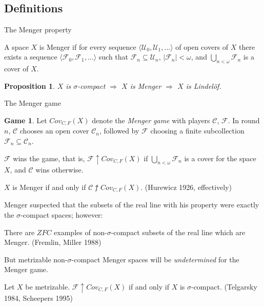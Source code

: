 \documentclass{beamer}
\newtheorem{proposition}[theorem]{Proposition}
\theoremstyle{definition}
\newtheorem{game}[theorem]{Game}
\newcommand{\win}{\uparrow}
\newcommand{\mengame}[1]{Cov_{C,F}(#1)}
\newcommand{\<}{\langle}
\renewcommand{\>}{\rangle}
\newcommand{\mc}[1]{\mathcal{#1}}
\newcommand{\pl}[1]{\mathscr{#1}}
\newcommand{\term}{\textit}
\begin{document}
\subsection{Definitions}

\begin{frame}{The Menger property}
  \begin{definition}
    A space $X$ is Menger if for every sequence $\<\mc U_0,\mc U_1,\dots\>$
    of open covers of $X$ there exists a sequence
    $\<\mc F_0,\mc F_1,\dots\>$ such that $\mc F_n\subseteq \mc U_n$,
    $|\mc F_n|<\omega$, and $\bigcup_{n<\omega}\mc F_n$ is a cover of $X$.
  \end{definition}

  \pause

  \begin{proposition}
    $X$ is $\sigma$-compact
      $\Rightarrow$
    $X$ is Menger
      $\Rightarrow$
    $X$ is Lindel\"of.
  \end{proposition}
\end{frame}

\begin{frame}{The Menger game}
  \begin{game}
    Let $\mengame{X}$ denote the \term{Menger game} with players
    $\pl C$, $\pl F$.
    In round $n$, $\pl C$ chooses an open cover $\mc C_n$,
    followed by $\pl F$
    choosing a finite subcollection $\mc F_n\subseteq \mc C_n$.

    $\pl F$ wins the game, that is, $\pl F \win \mengame{X}$ if
    $\bigcup_{n<\omega}\mc F_n$ is a cover for the space
    $X$, and $\pl C$ wins otherwise.
  \end{game}

  \pause

  \begin{theorem}
    $X$ is Menger if and only if $\pl C \not\win \mengame X$.
    (Hurewicz 1926, effectively)
  \end{theorem}
\end{frame}

\begin{frame}
  Menger suspected that the subsets of the real line with his property were
  exactly the $\sigma$-compact spaces; however:

  \pause

  \begin{theorem}
    There are $ZFC$ examples of non-$\sigma$-compact
    subsets of the real line which are Menger. (Fremlin, Miller 1988)
  \end{theorem}

  But metrizable non-$\sigma$-compact Menger spaces will be
  \term{undetermined} for the Menger game.

  \pause

  \begin{theorem}
    Let $X$ be metrizable. $\pl F\win\mengame X$ if and only if $X$ is
    $\sigma$-compact. (Telgarsky 1984, Scheepers 1995)
  \end{theorem}
\end{frame}
\end{document}
